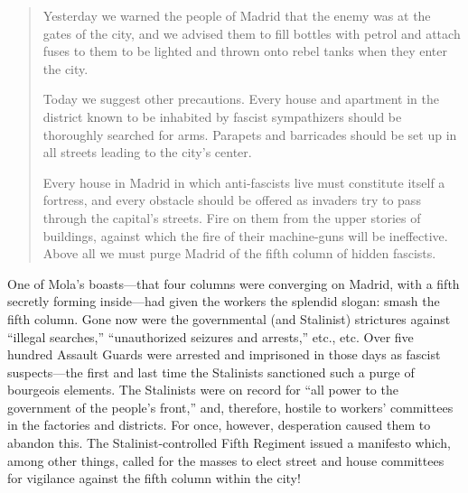 \begin{quotation}
  Yesterday we warned the people of Madrid that the enemy was at the gates of the city, and we advised them to fill bottles with petrol and attach fuses to them to be lighted and thrown onto rebel tanks when they enter the city.
  
  Today we suggest other precautions. Every house and apartment in the district known to be inhabited by fascist sympathizers should be thoroughly searched for arms. Parapets and barricades should be set up in all streets leading to the city’s center.
  
  Every house in Madrid in which anti-fascists live must constitute itself a fortress, and every obstacle should be offered as invaders try to pass through the capital’s streets. Fire on them from the upper stories of buildings, against which the fire of their machine-guns will be ineffective. Above all we must purge Madrid of the fifth column of hidden fascists.
\end{quotation}

One of Mola’s boasts—that four columns were converging on Mad\-rid, with a fifth secretly forming inside—had given the workers the splendid slogan: smash the fifth column. Gone now were the governmental (and Stalinist) strictures against ``illegal searches,'' ``unauthorized seizures and arrests,'' etc., etc. Over five hundred Assault Guards were arrested and imprisoned in those days as fascist suspects—the first and last time the Stalinists sanctioned such a purge of bourgeois elements. The Stalinists were on record for ``all power to the government of the people’s front,'' and, therefore, hostile to workers’ committees in the factories and districts. For once, however, desperation caused them to abandon this. The Stalinist-controlled Fifth Regiment issued a manifesto which, among other things, called for the masses to elect street and house committees for vigilance against the fifth column within the city!%

